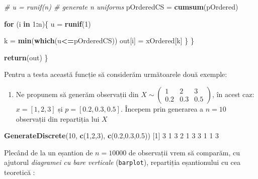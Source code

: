 \documentclass[]{article}
\newenvironment{Shaded}{\begin{snugshade}}{\end{snugshade}}
\newcommand{\CommentTok}[1]{\textcolor[rgb]{0.56,0.35,0.01}{\textit{#1}}}
\newcommand{\ControlFlowTok}[1]{\textcolor[rgb]{0.13,0.29,0.53}{\textbf{#1}}}
\newcommand{\DecValTok}[1]{\textcolor[rgb]{0.00,0.00,0.81}{#1}}
\newcommand{\FloatTok}[1]{\textcolor[rgb]{0.00,0.00,0.81}{#1}}
\newcommand{\KeywordTok}[1]{\textcolor[rgb]{0.13,0.29,0.53}{\textbf{#1}}}
\newcommand{\NormalTok}[1]{#1}
\newcommand{\OperatorTok}[1]{\textcolor[rgb]{0.81,0.36,0.00}{\textbf{#1}}}
\newcommand{\StringTok}[1]{\textcolor[rgb]{0.31,0.60,0.02}{#1}}
\providecommand{\tightlist}{%
  \setlength{\itemsep}{0pt}\setlength{\parskip}{0pt}}
\begin{document}
\begin{Shaded}
\begin{Highlighting}[]
    \CommentTok{# u = runif(n) # generate n uniforms}
\NormalTok{    pOrderedCS =}\StringTok{ }\KeywordTok{cumsum}\NormalTok{(pOrdered)}
    
    \ControlFlowTok{for}\NormalTok{ (i }\ControlFlowTok{in} \DecValTok{1}\OperatorTok{:}\NormalTok{n)\{}
\NormalTok{      u =}\StringTok{ }\KeywordTok{runif}\NormalTok{(}\DecValTok{1}\NormalTok{)}
      
\NormalTok{      k =}\StringTok{ }\KeywordTok{min}\NormalTok{(}\KeywordTok{which}\NormalTok{(u}\OperatorTok{<=}\NormalTok{pOrderedCS))}
\NormalTok{      out[i] =}\StringTok{ }\NormalTok{xOrdered[k]}
\NormalTok{    \}}
\NormalTok{  \}}
  
  \KeywordTok{return}\NormalTok{(out)}
\NormalTok{\}}
\end{Highlighting}
\end{Shaded}

Pentru a testa această funcție să considerăm următoarele două exemple:

\begin{enumerate}
\def\labelenumi{\arabic{enumi}.}
\tightlist
\item
  Ne propunem să generăm observații din
  \(X\sim\begin{pmatrix}1 & 2 & 3\\ 0.2 & 0.3 & 0.5\end{pmatrix}\), în
  acest caz: \(x=[1,2,3]\) și \(p=[0.2,0.3,0.5]\). Începem prin
  generarea a \(n = 10\) observații din repartiția lui \(X\)
\end{enumerate}

\begin{Shaded}
\begin{Highlighting}[]
\KeywordTok{GenerateDiscrete}\NormalTok{(}\DecValTok{10}\NormalTok{, }\KeywordTok{c}\NormalTok{(}\DecValTok{1}\NormalTok{,}\DecValTok{2}\NormalTok{,}\DecValTok{3}\NormalTok{), }\KeywordTok{c}\NormalTok{(}\FloatTok{0.2}\NormalTok{,}\FloatTok{0.3}\NormalTok{,}\FloatTok{0.5}\NormalTok{))}
\NormalTok{ [}\DecValTok{1}\NormalTok{] }\DecValTok{3} \DecValTok{1} \DecValTok{3} \DecValTok{2} \DecValTok{1} \DecValTok{3} \DecValTok{3} \DecValTok{1} \DecValTok{1} \DecValTok{3}
\end{Highlighting}
\end{Shaded}

Plecând de la un eșantion de \(n = 10000\) de observații vrem să
comparăm, cu ajutorul \emph{diagramei cu bare verticale}
(\texttt{barplot}), repartiția eșantionului cu cea teoretică :
\end{document}
